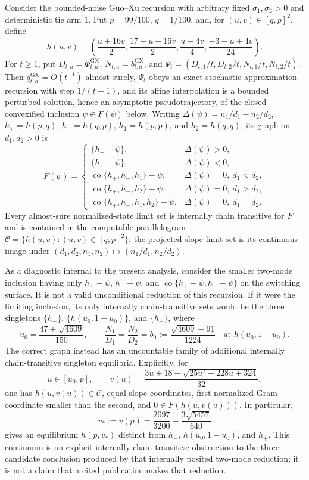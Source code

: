 Consider the bounded-noise Guo--Xu recursion with arbitrary fixed \(\sigma_1,\sigma_2>0\) and deterministic tie arm \(1\). Put \(p=99/100\), \(q=1/100\), and, for \((u,v)\in[q,p]^2\), define
\[
 h(u,v)=\left(\frac{u+16v}{2},\frac{17-u-16v}{2},
                 \frac{u-4v}{4},\frac{-3-u+4v}{24}\right).
\]
For \(t\ge1\), put \(D_{t,a}=\Phi^{\mathrm{GX}}_{t,a}\), \(N_{t,a}=b^{\mathrm{GX}}_{t,a}\), and \(\Psi_t=(D_{t,1}/t,D_{t,2}/t,N_{t,1}/t,N_{t,2}/t)\). Then \(q^{\mathrm{GX}}_{t,a}=O(t^{-1})\) almost surely, \(\Psi_t\) obeys an exact stochastic-approximation recursion with step \(1/(t+1)\), and its affine interpolation is a bounded perturbed solution, hence an asymptotic pseudotrajectory, of the closed convexified inclusion \(\dot\psi\in F(\psi)\) below. Writing \(\Delta(\psi)=n_1/d_1-n_2/d_2\), \(h_+=h(p,q)\), \(h_-=h(q,p)\), \(h_1=h(p,p)\), and \(h_2=h(q,q)\), its graph on \(d_1,d_2>0\) is
\[
 F(\psi)=
 \begin{cases}
  \{h_+-\psi\},&\Delta(\psi)>0,\\
  \{h_--\psi\},&\Delta(\psi)<0,\\
  \operatorname{co}\{h_+,h_-,h_1\}-\psi,&\Delta(\psi)=0,\ d_1<d_2,\\
  \operatorname{co}\{h_+,h_-,h_2\}-\psi,&\Delta(\psi)=0,\ d_1>d_2,\\
  \operatorname{co}\{h_+,h_-,h_1,h_2\}-\psi,&\Delta(\psi)=0,\ d_1=d_2.
 \end{cases}
\]
Every almost-sure normalized-state limit set is internally chain transitive for \(F\) and is contained in the computable parallelogram \(\mathcal C=\{h(u,v):(u,v)\in[q,p]^2\}\); the projected slope limit set is its continuous image under \((d_1,d_2,n_1,n_2)\mapsto(n_1/d_1,n_2/d_2)\).

As a diagnostic internal to the present analysis, consider the smaller two-mode inclusion having only \(h_+-\psi\), \(h_--\psi\), and \(\operatorname{co}\{h_+-\psi,h_--\psi\}\) on the switching surface. It is not a valid unconditional reduction of this recursion. If it were the limiting inclusion, its only internally chain-transitive sets would be the three singletons \(\{h_-\}\), \(\{h(u_0,1-u_0)\}\), and \(\{h_+\}\), where
\[
 u_0=\frac{47+\sqrt{4609}}{150},\qquad
 \frac{N_1}{D_1}=\frac{N_2}{D_2}
 =b_0:=\frac{\sqrt{4609}-91}{1224}
 \quad\text{at }h(u_0,1-u_0).
\]
The correct graph instead has an uncountable family of additional internally chain-transitive singleton equilibria. Explicitly, for
\[
 u\in[u_0,p],\qquad
 v(u)=\frac{3u+18-\sqrt{25u^2-228u+324}}{32},
\]
one has \(h(u,v(u))\in\mathcal C\), equal slope coordinates, first normalized Gram coordinate smaller than the second, and \(0\in F(h(u,v(u)))\). In particular,
\[
 v_*:=v(p)=\frac{2097}{3200}-\frac{3\sqrt{5457}}{640}
\]
gives an equilibrium \(h(p,v_*)\) distinct from \(h_-\), \(h(u_0,1-u_0)\), and \(h_+\). This continuum is an explicit internally-chain-transitive obstruction to the three-candidate conclusion produced by that internally posited two-mode reduction; it is not a claim that a cited publication makes that reduction.

